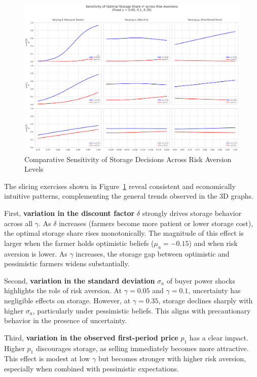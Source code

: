 \begin{figure}[pht]
\centering
\includegraphics[width=\textwidth]{figures/sensitivity_comparative.png}
\caption{Comparative Sensitivity of Storage Decisions Across Risk Aversion Levels}
\label{Figure: sensitivity_comparative}
\end{figure}


The slicing exercises shown in Figure~\ref{Figure: sensitivity_comparative} reveal consistent and economically intuitive patterns, complementing the general trends observed in the 3D graphs.

First, \textbf{variation in the discount factor} $\delta$ strongly drives storage behavior across all $\gamma$. As $\delta$ increases (farmers become more patient or lower storage cost), the optimal storage share rises monotonically. The magnitude of this effect is larger when the farmer holds optimistic beliefs ($\mu_a = -0.15$) and when risk aversion is lower. As $\gamma$ increases, the storage gap between optimistic and pessimistic farmers widens substantially.

Second, \textbf{variation in the standard deviation} $\sigma_a$ of buyer power shocks highlights the role of risk aversion. At $\gamma=0.05$ and $\gamma=0.1$, uncertainty has negligible effects on storage. However, at $\gamma=0.35$, storage declines sharply with higher $\sigma_a$, particularly under pessimistic beliefs. This aligns with precautionary behavior in the presence of uncertainty.

Third, \textbf{variation in the observed first-period price} $p_1$ has a clear impact. Higher $p_1$ discourages storage, as selling immediately becomes more attractive. This effect is modest at low $\gamma$ but becomes stronger with higher risk aversion, especially when combined with pessimistic expectations.

